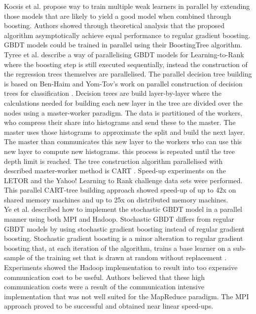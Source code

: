Kocsis et al. \cite{Kocsis2013} propose way to train multiple weak learners in parallel by extending those models that are likely to yield a good model when combined through boosting. Authors showed through theoretical analysis that the proposed algorithm asymptotically achieve equal performance to regular gradient boosting. \ac{GBDT} models could be trained in parallel using their BoostingTree algorithm.\\

Tyree et al. \cite{Tyree2011} describe a way of parallelising \ac{GBDT} models for Learning-to-Rank where the boosting step is still executed sequentially, instead the construction of the regression trees themselves are parallelised. The parallel decision tree building is based on Ben-Haim and Yom-Tov's work on parallel construction of decision trees for classification \cite{Ben-Haim2010}. Decision trees are build layer-by-layer where the calculations needed for building each new layer in the tree are divided over the nodes using a master-worker paradigm. The data is partitioned of the workers, who compress their share into histograms and send these to the master. The master uses those histograms to approximate the split and build the next layer. The master than communicates this new layer to the workers who can use this new layer to compute new histograms. this process is repeated until the tree depth limit is reached. The tree construction algorithm parallelised with described master-worker method is \ac{CART} \cite{Breiman1984}. Speed-up experiments on the LETOR and the Yahoo! Learning to Rank challenge data sets were performed. This parallel \ac{CART}-tree building approach showed speed-up of up to 42x on shared memory machines and up to 25x on distributed memory machines.\\

Ye et al. \cite{Ye2009} described how to implement the stochastic \ac{GBDT} model in a parallel manner using both MPI and Hadoop. Stochastic \ac{GBDT} differs from regular \ac{GBDT} models by using stochastic gradient boosting instead of regular gradient boosting. Stochastic gradient boosting is a minor alteration to regular gradient boosting that, at each iteration of the algorithm, trains a base learner on a sub-sample of the training set that is drawn at random without replacement \cite{Friedman2002}. Experiments showed the Hadoop implementation to result into too expensive communication cost to be useful. Authors believed that these high communication costs were a result of the communication intensive implementation that was not well suited for the MapReduce paradigm. The MPI approach proved to be successful and obtained near linear speed-ups.\\

